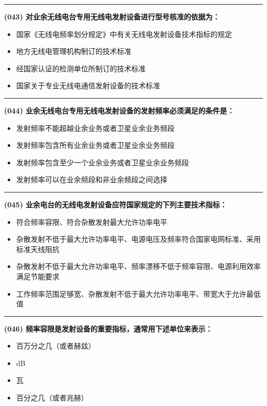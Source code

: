 \documentclass[twocolumn]{ctexart}  %
\begin{document}
\noindent\rule{0.5\textwidth}{1pt}
\heiti \textbf{(043) 对业余无线电台专用无线电发射设备进行型号核准的依据为：} \songti {\color{gray} [LK0039] }
\begin{itemize}
	\item  国家《无线电频率划分规定》中有关无线电发射设备技术指标的规定
	\item  地方无线电管理机构制订的技术标准
	\item  经国家认证的检测单位所制订的技术标准
	\item  国家关于专业无线电通信发射设备的技术标准
\end{itemize}


\noindent\rule{0.5\textwidth}{1pt}
\heiti \textbf{(044) 业余无线电台专用无线电发射设备的发射频率必须满足的条件是：} \songti {\color{gray} [LK0040] }
\begin{itemize}
	\item  发射频率不能超越业余业务或者卫星业余业务频段
	\item  发射频率包含所有业余业务或者卫星业余业务频段
	\item  发射频率包含至少一个业余业务或者卫星业余业务频段
	\item  发射频率可以在业余频段和非业余频段之间选择
\end{itemize}


\noindent\rule{0.5\textwidth}{1pt}
\heiti \textbf{(045) 业余电台的无线电发射设备应符国家规定的下列主要技术指标：} \songti {\color{gray} [LK0116] }
\begin{itemize}
	\item  符合频率容限、符合杂散发射最大允许功率电平
	\item  杂散发射不低于最大允许功率电平、电源电压及频率符合国家电网标准、采用标准天线阻抗
	\item  杂散发射不低于最大允许功率电平、频率漂移不低于频率容限、电源利用效率满足节能要求
	\item  工作频率范围足够宽、杂散发射不低于最大允许功率电平、带宽大于允许最低值
\end{itemize}


\noindent\rule{0.5\textwidth}{1pt}
\heiti \textbf{(046) 频率容限是发射设备的重要指标，通常用下述单位来表示：} \songti {\color{gray} [LK0117] }
\begin{itemize}
	\item  百万分之几（或者赫兹）
	\item  dB
	\item  瓦
	\item  百分之几（或者兆赫）
\end{itemize}
\end{document}
